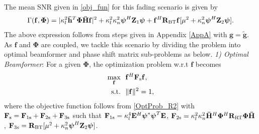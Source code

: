 \documentclass[journal,draftclsnofoot,onecolumn,12pt]{IEEEtran}
\begin{document}
The mean SNR given in \eqref{obj_fun} for this fading scenario is given by
\begin{align}
    \Gamma(\mathbf{f}, \mathbf{\Phi}) = |\kappa_l^2\mathbf{\Bar{h}}^T\mathbf{\Phi\Bar{H}f}|^2 + \kappa_l^2\kappa_n^2\boldsymbol{\psi}^H\mathbf{Z}_1\boldsymbol{\psi} +\mathbf{f}^H\mathbf{R}_{\rm BT}\mathbf{f}[\mu^2+\kappa_n^2\boldsymbol{\psi}^H\mathbf{Z}_2\boldsymbol{\psi}].\label{OptProb_R2}
\end{align}
The above expression follows from steps given in Appendix \ref{AppA} with $\mathbf{g}=\mathbf{\tilde{g}}$.
 As $\mathbf{f}$ and $\mathbf{\Phi}$ are coupled, we tackle this scenario by dividing the problem into optimal beamformer and phase shift matrix sub-problems as below.\newline
 \emph{1) Optimal Beamformer}: For a given $\mathbf{\Phi}$, the optimization problem w.r.t $\mathbf{f}$ becomes
 \vspace{-0.3cm}
    \begin{subequations}
    \begin{align}
    \max_{\mathbf{f}} ~~& \mathbf{f}^H\mathbf{F}_{\rm s}\mathbf{f}, \label{subprob_f_R2}\\
   \text{s.t.} ~~& \|\mathbf{f}\|^2 = 1,
    \end{align}
    \end{subequations}
where the objective function follows from \eqref{OptProb_R2} with $\mathbf{F}_{\rm s} = \mathbf{F}_{\rm 1s} + \mathbf{F}_{\rm 2s} + \mathbf{F}_{\rm 3s}$
such that $\mathbf{F}_{\rm 1s} = \kappa_l^4\mathbf{E}^H\boldsymbol{\psi}^*\boldsymbol{\psi}^T\mathbf{E}$, $\mathbf{F}_{\rm 2s} = \kappa_l^2\kappa_n^2\mathbf{\Bar{H}}^H\mathbf{\Phi}^H\mathbf{R}_{\rm RT}\mathbf{\Phi\Bar{H}}$, $\mathbf{F}_{\rm 3s} = \mathbf{R}_{\rm BT}[\mu^2+\kappa_n^2\boldsymbol{\psi}^H\mathbf{Z}_2\boldsymbol{\psi}]$.
\end{document}
